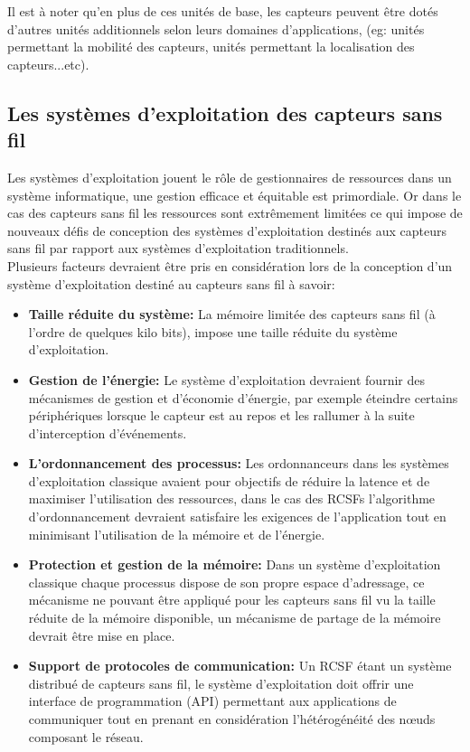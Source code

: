 	Il est à noter qu'en plus de ces unités de base, les capteurs peuvent être dotés d'autres unités additionnels selon leurs domaines d'applications, (eg: unités permettant la mobilité des capteurs, unités permettant la localisation des capteurs...etc).
	
	\subsection{Les systèmes d'exploitation des capteurs sans fil}
 Les systèmes d'exploitation jouent le rôle de gestionnaires de ressources dans un système informatique, une gestion efficace et équitable est primordiale. Or dans le cas des capteurs sans fil les ressources sont extrêmement limitées ce qui impose de nouveaux défis de conception des systèmes d'exploitation destinés aux capteurs sans fil par rapport aux systèmes d'exploitation traditionnels.\\
 Plusieurs facteurs devraient être pris en considération lors de la conception d'un système d'exploitation destiné au capteurs sans fil à savoir:
 \begin{itemize}
 \item \textbf{Taille réduite du système: }La mémoire limitée des capteurs sans fil (à l'ordre de quelques kilo bits), impose une taille réduite du système d'exploitation. 
 
 \item \textbf{Gestion de l'énergie: }Le système d'exploitation devraient fournir des mécanismes de gestion et d'économie d'énergie, par exemple éteindre certains périphériques lorsque le capteur est au repos et les rallumer à la suite d'interception d'événements.
 
 \item \textbf{L'ordonnancement des processus: }Les ordonnanceurs dans les systèmes d'exploitation classique avaient pour objectifs de réduire la latence et de maximiser l'utilisation des ressources, dans le cas des RCSFs l'algorithme d'ordonnancement devraient satisfaire les exigences de l'application tout en minimisant l'utilisation de la mémoire et de l'énergie. 
 
 \item \textbf{Protection et gestion de la mémoire: }Dans un système d'exploitation classique chaque processus dispose de son propre espace d'adressage, ce mécanisme ne pouvant être appliqué pour les capteurs sans fil vu la taille réduite de la mémoire disponible, un mécanisme de partage de la mémoire devrait être mise en place.
 
 \item \textbf{Support de protocoles de communication: }Un RCSF étant un système distribué de capteurs sans fil, le système d'exploitation doit offrir une interface de programmation (API) permettant aux applications de communiquer tout en prenant en considération l'hétérogénéité des nœuds composant le réseau. 

 \end{itemize}
 
